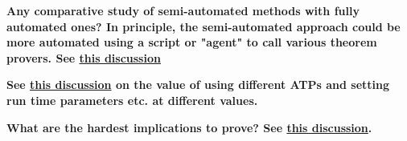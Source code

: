 {\bf Any comparative study of semi-automated methods with fully automated ones? In principle, the semi-automated approach could be more automated using a script or "agent" to call various theorem provers. See \href{https://leanprover.zulipchat.com/#narrow/stream/458659-Equational/topic/A.20magma.20of.20order.20.3C.2013.20-.20for.20Equation2531.3F}{this discussion}}


{\bf See \href{https://leanprover.zulipchat.com/#narrow/channel/458659-Equational/topic/1516.20-.3E.20255/near/481547543}{this discussion} on the value of using different ATPs and setting run time parameters etc. at different values.}

{\bf What are the hardest implications to prove?  See \href{https://leanprover.zulipchat.com/#narrow/channel/458659-Equational/topic/What.20are.20the.20hardest.20positive.20implications.20for.20an.20ATP.3F}{this discussion}.}
